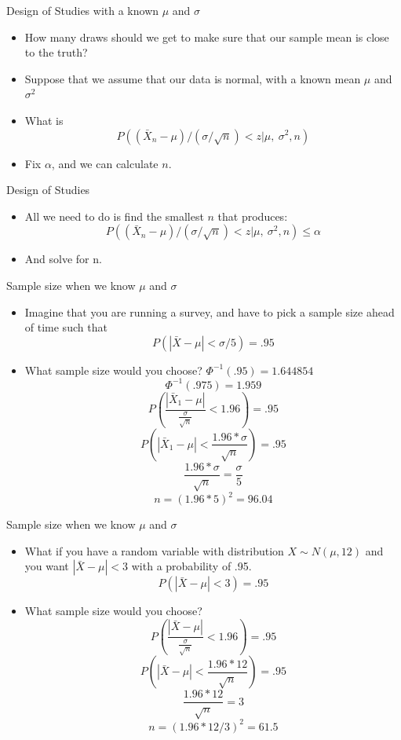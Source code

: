 \documentclass{beamer}
\numberwithin{equation}{section}
\begin{document}
\begin{frame}{Design of Studies with a known $\mu$ and $\sigma$}
\begin{itemize}
\item How many draws should we get to make sure that our sample mean is close to the truth?\pause
\item Suppose that we assume that our data is normal, with a known mean $\mu$ and $\sigma^2$\pause
\item What is 
$$P((\bar{X}_n-\mu)/(\sigma/\sqrt{n})<z|\mu,\ \sigma^2, n)$$\pause
\item Fix $\alpha$, and we can calculate $n$.
\end{itemize}
\end{frame}


\begin{frame}{Design of Studies}
\begin{itemize}
\item All we need to do is find the smallest $n$ that produces:
$$P((\bar{X}_n-\mu)/(\sigma/\sqrt{n})<z|\mu,\ \sigma^2, n)\leq \alpha $$
\item And solve for n.
\end{itemize}
\end{frame}

\begin{frame}{Sample size when we know $\mu$ and $\sigma$}
\begin{itemize}
\item Imagine that you are running a survey, and have to pick a
sample size ahead of time such that    
$$P( | \bar X -\mu| < \sigma / 5) =.95$$\pause
\item What sample size would you choose? $\Phi^{-1}(.95)=1.644854$\pause
$$\Phi^{-1}(.975)=1.959$$\pause
$$P( \frac{| \bar X_1  -\mu|}{\frac{\sigma}{\sqrt{n}}} < 1.96) =.95$$\pause
$$P(| \bar X_1  -\mu| < \frac{1.96*\sigma}{\sqrt{n}}) = .95$$\pause
$$\frac{1.96*\sigma}{\sqrt{n}}=\frac{\sigma}{5}$$\pause
$$n=(1.96*5)^2=96.04$$

\end{itemize}
\end{frame}



\begin{frame}{Sample size when we know $\mu$ and $\sigma$}
\begin{itemize}
\item What if you have a random variable with distribution $X\sim N(\mu, 12)$ and you want $|\bar{X}-\mu|<3$ with a probability of .95.
$$P( | \bar X -\mu| <3 )=.95$$\pause
\item What sample size would you choose?
$$P( \frac{| \bar X  -\mu|}{\frac{\sigma}{\sqrt{n}}} < 1.96) =.95$$\pause
$$P(| \bar X  -\mu| < \frac{1.96*12}{\sqrt{n}}) = .95$$\pause
$$\frac{1.96*12}{\sqrt{n}}=3$$\pause
$$n=(1.96*12/3)^2=61.5$$

\end{itemize}
\end{frame}
\end{document}
